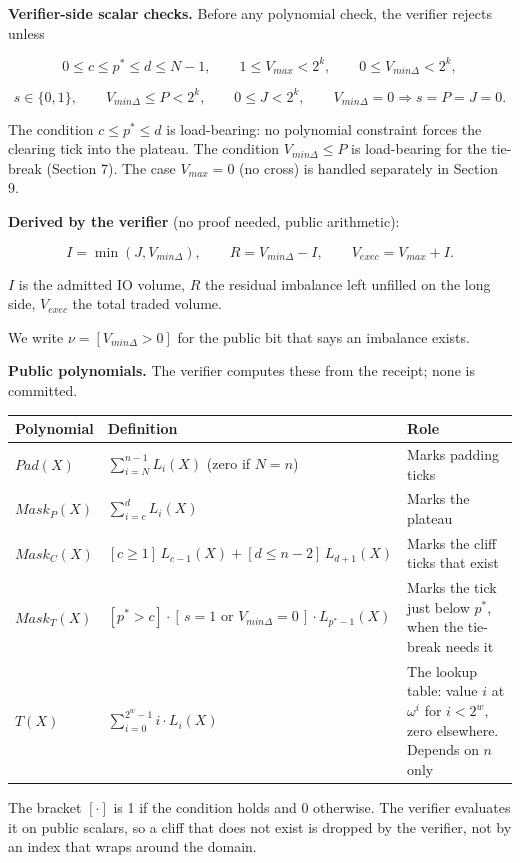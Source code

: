 \textbf{Verifier-side scalar checks.} Before any polynomial check, the verifier rejects unless

\[0 \le c \le p^* \le d \le N-1, \qquad 1 \le V_{max} < 2^k, \qquad 0 \le V_{min\Delta} < 2^k,\]

\[s \in \{0,1\}, \qquad V_{min\Delta} \le P < 2^k, \qquad 0 \le J < 2^k, \qquad V_{min\Delta} = 0 \Rightarrow s = P = J = 0.\]

The condition \(c \le p^* \le d\) is load-bearing: no polynomial constraint forces the clearing tick into the plateau. The condition \(V_{min\Delta} \le P\) is load-bearing for the tie-break (Section 7). The case \(V_{max} = 0\) (no cross) is handled separately in Section 9.

\textbf{Derived by the verifier} (no proof needed, public arithmetic):

\[I = \min(J, V_{min\Delta}), \qquad R = V_{min\Delta} - I, \qquad V_{exec} = V_{max} + I.\]

\(I\) is the admitted IO volume, \(R\) the residual imbalance left unfilled on the long side, \(V_{exec}\) the total traded volume.

We write \(\nu = [V_{min\Delta} > 0]\) for the public bit that says an imbalance exists.

\textbf{Public polynomials.} The verifier computes these from the receipt; none is committed.

\begin{longtable}[]{@{}lll@{}}
\toprule\noalign{}
Polynomial & Definition & Role \\
\midrule\noalign{}
\endhead
\bottomrule\noalign{}
\endlastfoot
\(Pad(X)\) & \(\sum_{i=N}^{n-1} L_i(X)\) (zero if \(N = n\)) & Marks padding ticks \\
\(Mask_P(X)\) & \(\sum_{i=c}^{d} L_i(X)\) & Marks the plateau \\
\(Mask_C(X)\) & \([c \ge 1]\,L_{c-1}(X) + [d \le n-2]\,L_{d+1}(X)\) & Marks the cliff ticks that exist \\
\(Mask_T(X)\) & \([p^* > c]\cdot[\,s = 1 \text{ or } V_{min\Delta} = 0\,]\cdot L_{p^*-1}(X)\) & Marks the tick just below \(p^*\), when the tie-break needs it \\
\(T(X)\) & \(\sum_{i=0}^{2^w-1} i \cdot L_i(X)\) & The lookup table: value \(i\) at \(\omega^i\) for \(i < 2^w\), zero elsewhere. Depends on \(n\) only \\
\end{longtable}

The bracket \([\cdot]\) is 1 if the condition holds and 0 otherwise. The verifier evaluates it on public scalars, so a cliff that does not exist is dropped by the verifier, not by an index that wraps around the domain.

